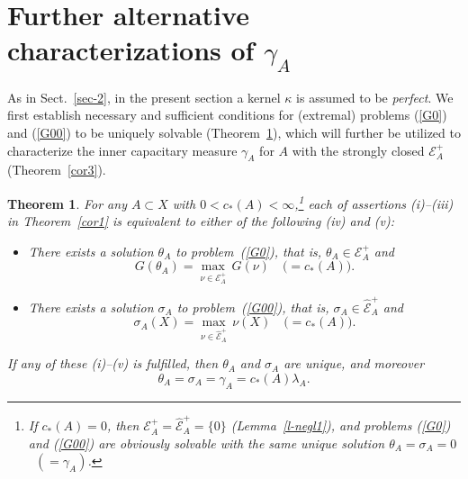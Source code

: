 \documentclass[12pt,a4paper,reqno]{amsart} %
\theoremstyle{lause}
\theoremstyle{maaritelma}
\theoremstyle{lause}
\newtheorem{theorem}{Theorem}[section]
\theoremstyle{maaritelma}
\numberwithin{equation}{section}
\begin{document}
\section{Further alternative characterizations of $\gamma_A$}\label{sec-ch}

As in Sect.~\ref{sec-2}, in the present section a kernel $\kappa$ is assumed to be {\it perfect}.
We first establish necessary and sufficient conditions for (extremal) problems (\ref{G0}) and (\ref{G00}) to be uniquely solvable (Theorem~\ref{th-ch}), which will further be utilized to characterize the inner capacitary measure $\gamma_A$ for
 $A$ with the strongly closed $\mathcal E^+_A$ (Theorem~\ref{cor3}).

\begin{theorem}\label{th-ch}For any\/ $A\subset X$ with\/ $0<c_*(A)<\infty$,\footnote{If $c_*(A)=0$, then $\mathcal E^+_A=\widehat{\mathcal E}^+_A=\{0\}$ (Lemma~\ref{l-negl1}), and problems (\ref{G0}) and (\ref{G00}) are obviously solvable with the same unique solution $\theta_A=\sigma_A=0$ \ $({}=\gamma_A)$.}
each of assertions\/ {\rm(i)}--{\rm(iii)} in Theorem\/~{\rm\ref{cor1}} is equivalent to either of the following\/ {\rm(iv)} and\/ {\rm(v)}:
\begin{itemize}
  \item[{\rm(iv)}] There exists a solution\/ $\theta_A$ to problem\/~{\rm(\ref{G0})}, that is, $\theta_A\in\mathcal E^+_A$ and
  \[G(\theta_A)=\max_{\nu\in\mathcal E^+_A}\,G(\nu)\quad\bigl({}=c_*(A)\bigr).\]
  \item[{\rm(v)}] There exists a solution\/ $\sigma_A$ to problem\/~{\rm(\ref{G00})}, that is, $\sigma_A\in\widehat{\mathcal E}^+_A$ and
  \[\sigma_A(X)=\max_{\nu\in\widehat{\mathcal E}^+_A}\,\nu(X)\quad\bigl({}=c_*(A)\bigr).\]
  \end{itemize}
  If any of these\/ {\rm(i)}--{\rm(v)} is fulfilled, then\/ $\theta_A$ and\/ $\sigma_A$ are unique, and moreover
  \[\theta_A=\sigma_A=\gamma_A=c_*(A)\lambda_A.\]
  \end{theorem}
\end{document}
